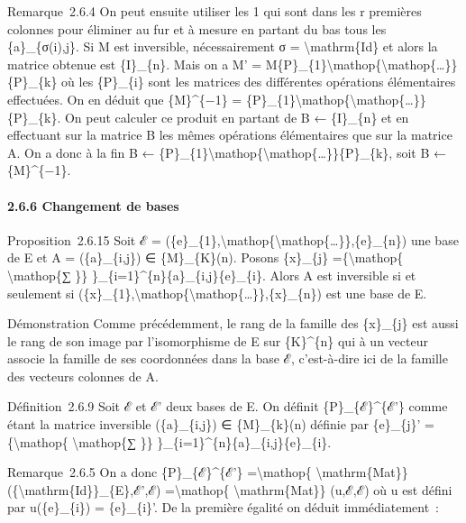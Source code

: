 \documentclass[]{article}
\begin{document}
Remarque~2.6.4 On peut ensuite utiliser les 1 qui sont dans les r
premières colonnes pour éliminer au fur et à mesure en partant du bas
tous les \{a\}\_\{σ(i),j\}. Si M est inversible, nécessairement σ =
\textbackslash{}mathrm\{Id\} et alors la matrice obtenue est
\{I\}\_\{n\}. Mais on a M' =
M\{P\}\_\{1\}\textbackslash{}mathop\{\textbackslash{}mathop\{\ldots{}\}\}\{P\}\_\{k\}
où les \{P\}\_\{i\} sont les matrices des différentes opérations
élémentaires effectuées. On en déduit que \{M\}\^{}\{−1\} =
\{P\}\_\{1\}\textbackslash{}mathop\{\textbackslash{}mathop\{\ldots{}\}\}\{P\}\_\{k\}.
On peut calculer ce produit en partant de B ← \{I\}\_\{n\} et en
effectuant sur la matrice B les mêmes opérations élémentaires que sur la
matrice A. On a donc à la fin B ←
\{P\}\_\{1\}\textbackslash{}mathop\{\textbackslash{}mathop\{\ldots{}\}\}\{P\}\_\{k\},
soit B ← \{M\}\^{}\{−1\}.

\paragraph{2.6.6 Changement de bases}

Proposition~2.6.15 Soit ℰ =
(\{e\}\_\{1\},\textbackslash{}mathop\{\textbackslash{}mathop\{\ldots{}\}\},\{e\}\_\{n\})
une base de E et A = (\{a\}\_\{i,j\}) ∈ \{M\}\_\{K\}(n). Posons
\{x\}\_\{j\} =\{\textbackslash{}mathop\{ \textbackslash{}mathop\{∑ \}\}
\}\_\{i=1\}\^{}\{n\}\{a\}\_\{i,j\}\{e\}\_\{i\}. Alors A est inversible
si et seulement si
(\{x\}\_\{1\},\textbackslash{}mathop\{\textbackslash{}mathop\{\ldots{}\}\},\{x\}\_\{n\})
est une base de E.

Démonstration Comme précédemment, le rang de la famille des \{x\}\_\{j\}
est aussi le rang de son image par l'isomorphisme de E sur
\{K\}\^{}\{n\} qui à un vecteur associe la famille de ses coordonnées
dans la base ℰ, c'est-à-dire ici de la famille des vecteurs colonnes de
A.

Définition~2.6.9 Soit ℰ et ℰ' deux bases de E. On définit
\{P\}\_\{ℰ\}\^{}\{ℰ'\} comme étant la matrice inversible
(\{a\}\_\{i,j\}) ∈ \{M\}\_\{k\}(n) définie par \{e\}\_\{j\}'
=\{\textbackslash{}mathop\{ \textbackslash{}mathop\{∑ \}\}
\}\_\{i=1\}\^{}\{n\}\{a\}\_\{i,j\}\{e\}\_\{i\}.

Remarque~2.6.5 On a donc \{P\}\_\{ℰ\}\^{}\{ℰ'\}
=\textbackslash{}mathop\{ \textbackslash{}mathrm\{Mat\}\}
(\{\textbackslash{}mathrm\{Id\}\}\_\{E\},ℰ',ℰ) =\textbackslash{}mathop\{
\textbackslash{}mathrm\{Mat\}\} (u,ℰ,ℰ) où u est défini par
u(\{e\}\_\{i\}) = \{e\}\_\{i\}'. De la première égalité on déduit
immédiatement~:
\end{document}
